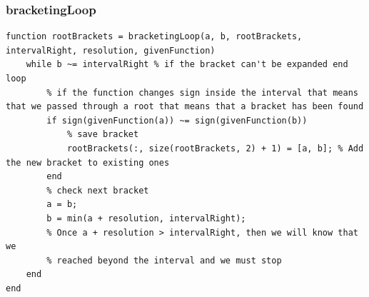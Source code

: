 \subsubsection{bracketingLoop}
\begin{simplechar}
\begin{lstlisting}
function rootBrackets = bracketingLoop(a, b, rootBrackets, intervalRight, resolution, givenFunction)
    while b ~= intervalRight % if the bracket can't be expanded end loop
        % if the function changes sign inside the interval that means that we passed through a root that means that a bracket has been found
        if sign(givenFunction(a)) ~= sign(givenFunction(b))
            % save bracket
            rootBrackets(:, size(rootBrackets, 2) + 1) = [a, b]; % Add the new bracket to existing ones
        end
        % check next bracket
        a = b;
        b = min(a + resolution, intervalRight);
        % Once a + resolution > intervalRight, then we will know that we
        % reached beyond the interval and we must stop
    end
end
\end{lstlisting}
\end{simplechar}

\newpage
